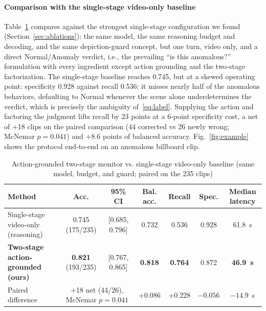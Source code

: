 \documentclass[conference]{IEEEtran}
\begin{document}
\paragraph{Comparison with the single-stage video-only baseline} Table~\ref{tab:baseline} compares against the strongest single-stage configuration we found (Section~\ref{sec:ablations}): the same model, the same reasoning budget and decoding, and the same depiction-guard concept, but one turn, video only, and a direct Normal/Anomaly verdict, i.e., the prevailing ``is this anomalous?'' formulation with every ingredient except action grounding and the two-stage factorization. The single-stage baseline reaches 0.745, but at a skewed operating point: specificity 0.928 against recall 0.536: it misses nearly half of the anomalous behaviors, defaulting to Normal whenever the scene alone underdetermines the verdict, which is precisely the ambiguity of~\eqref{eq:label}. Supplying the action and factoring the judgment lifts recall by 23 points at a 6-point specificity cost, a net of +18 clips on the paired comparison (44 corrected vs 26 newly wrong; McNemar $p = 0.041$) and +8.6 points of balanced accuracy. Fig.~\ref{fig:example} shows the protocol end-to-end on an anomalous billboard clip.

\begin{table}[htbp]
\caption{Action-grounded two-stage monitor vs. single-stage video-only baseline (same model, budget, and guard; paired on the 235 clips)}
\begin{center}
\small
\begin{tabular}{|l|c|c|c|c|c|c|}
\hline
\textbf{Method} & \textbf{Acc.} & \textbf{95\% CI} & \textbf{Bal. acc.} & \textbf{Recall} & \textbf{Spec.} & \textbf{Median latency} \\
\hline
Single-stage video-only (reasoning) & 0.745 (175/235) & [0.685, 0.796] & 0.732 & 0.536 & 0.928 & 61.8~s \\
\hline
\textbf{Two-stage action-grounded (ours)} & \textbf{0.821} (193/235) & [0.767, 0.865] & \textbf{0.818} & \textbf{0.764} & 0.872 & \textbf{46.9~s} \\
\hline
Paired difference & \multicolumn{2}{c|}{+18 net (44/26), McNemar $p = 0.041$} & +0.086 & +0.228 & $-0.056$ & $-14.9$~s \\
\hline
\end{tabular}
\label{tab:baseline}
\end{center}
\end{table}
\end{document}
